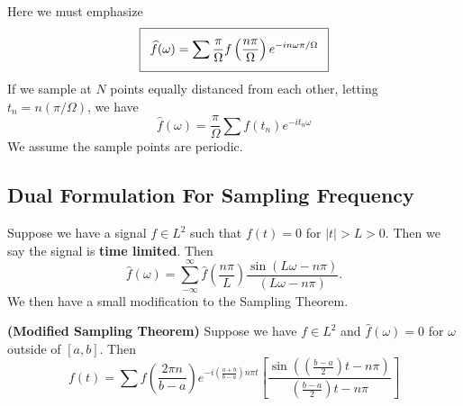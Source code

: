 Here we must emphasize
\begin{equation}
  \addtolength{\fboxsep}{5pt}
   \boxed{
   \begin{gathered}
     \widehat{f}(\omega) = \sum\frac{\pi}{\Omega}f\left(\frac{n\pi}{\Omega}\right)e^{-in\omega\pi/\Omega}
   \end{gathered}
   }
\end{equation}
If we sample at $N$ points equally distanced from each
other, letting $t_n = n(\pi/\Omega)$, we have
\begin{equation}
\widehat{f}(\omega) = \frac{\pi}{\Omega}\sum f(t_n)e^{-it_n\omega}
\end{equation}
We assume the sample points are periodic.

\subsection*{Dual Formulation For Sampling Frequency}

Suppose we have a signal $f\in L^2$ such that $f(t)=0$ for
$|t|>L>0$. Then we say the signal is \textbf{time
  limited}. Then
\begin{equation}
\widehat{f}(\omega) = \sum^{\infty}_{-\infty}\widehat{f}\left(\frac{n\pi}{L}\right)\frac{\sin(L\omega-n\pi)}{(L\omega-n\pi)}.
\end{equation}
We then have a small modification to the Sampling Theorem.

\begin{thm}{\textbf{(Modified Sampling Theorem)}}
Suppose we have $f\in L^2$ and $\widehat{f}(\omega)=0$ for
$\omega$ outside of $[a,b]$. Then
\begin{equation}
f(t) = \sum f\left(\frac{2\pi n}{b-a}\right)e^{-i\left(\frac{a+b}{b-a}\right)n\pi t}
\left[\frac{\sin\left(\left(\frac{b-a}{2}\right)t-n\pi\right)}{\left(\frac{b-a}{2}\right)t-n\pi}\right]
\end{equation}
\end{thm}

